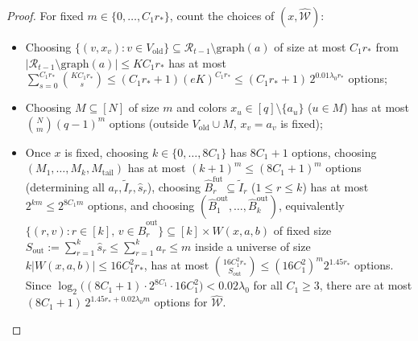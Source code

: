 \documentclass[11pt]{article}
\theoremstyle{definition}
\theoremstyle{remark}
\begin{document}
\begin{proof}
For fixed $m \in \{0, \dots, C_1 r_*\}$, count the choices of $(x, \widehat{\mathcal{W}})$:
\begin{itemize}[leftmargin=2em,nosep]
  \item Choosing $\{(v, x_v) : v \in V_{\mathrm{old}}\} \subseteq \mathcal{R}_{t-1} \setminus \mathrm{graph}(a)$ of size at most $C_1 r_*$ from $|\mathcal{R}_{t-1} \setminus \mathrm{graph}(a)| \le K C_1 r_*$ has at most $\sum_{s=0}^{C_1 r_*} \binom{K C_1 r_*}{s} \le (C_1 r_* + 1)(e K)^{C_1 r_*} \le (C_1 r_* + 1)\,2^{0.01 \lambda_0 r_*}$ options;
  \item Choosing $M \subseteq [N]$ of size $m$ and colors $x_u \in [q] \setminus \{a_u\}$ ($u \in M$) has at most $\binom{N}{m}(q - 1)^m$ options (outside $V_{\mathrm{old}} \cup M$, $x_v = a_v$ is fixed);
  \item Once $x$ is fixed, choosing $k \in \{0, \dots, 8 C_1\}$ has $8 C_1 + 1$ options, choosing $(M_1, \dots, M_k, M_{\mathrm{tail}})$ has at most $(k + 1)^m \le (8 C_1 + 1)^m$ options (determining all $a_r, \widetilde{I}_r, \hat{s}_r$), choosing $\widehat{B}_r^{\mathrm{fut}} \subseteq \widetilde{I}_r$ ($1 \le r \le k$) has at most $2^{k m} \le 2^{8 C_1 m}$ options, and choosing $(\widehat{B}_1^{\mathrm{out}}, \dots, \widehat{B}_k^{\mathrm{out}})$, equivalently $\{(r, v) : r \in [k],\, v \in \widehat{B}_r^{\mathrm{out}}\} \subseteq [k] \times W(x, a, b)$ of fixed size $S_{\mathrm{out}} := \sum_{r=1}^k \hat{s}_r \le \sum_{r=1}^k a_r \le m$ inside a universe of size $k |W(x, a, b)| \le 16 C_1^2 r_*$, has at most $\binom{16 C_1^2 r_*}{S_{\mathrm{out}}} \le (16 C_1^2)^m 2^{1.45 r_*}$ options. Since $\log_2\bigl((8 C_1 + 1) \cdot 2^{8 C_1} \cdot 16 C_1^2\bigr) < 0.02 \lambda_0$ for all $C_1 \ge 3$, there are at most $(8 C_1 + 1)\,2^{1.45 r_* + 0.02 \lambda_0 m}$ options for $\widehat{\mathcal{W}}$.
\end{itemize}


\end{proof}
\end{document}
